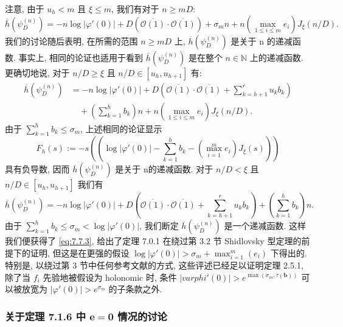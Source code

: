 注意, 由于 \(u_h < m\) 且 \(\xi \le m\), 我们有对于 \(n \ge mD\):
\[ \overline{h}(\psi_D^{(n)}) = -n\log|\varphi'(0)| + D\left(\overline{\mathcal{O}(1)} \cdot \overline{\mathcal{O}(1)}\right) + \sigma_m n + n\left(\max_{1 \le i \le m} e_i\right) J_{\xi}(n/D). \]
我们的讨论随后表明, 在所需的范围 \(n \geq mD\) 上, \(\overline{h}(\psi_D^{(n)})\) 是关于 n 的递减函数. 
事实上, 相同的论证也适用于看到 \(\overline{h}(\psi_D^{(n)})\) 是在整个 \(n \in \mathbb{N}\) 上的递减函数. 
更确切地说, 对于 \(n/D \geq \xi\) 且 \(n/D \in [u_h, u_{h+1}]\) 有:
\begin{equation}\label{eq:7.7.4}
\begin{aligned}
\overline{h}(\psi_D^{(n)}) 
&= -n\log|\varphi'(0)| + D\left(\overline{\mathcal{O}(1)} \cdot \overline{\mathcal{O}(1)} + \sum_{k=h+1}^r u_k b_k\right) \\
&\quad + \left(\sum_{k=1}^h b_k\right) n + n\left(\max_{1 \le i \le m} e_i\right) J_{\xi}(n/D).
\end{aligned}
\end{equation}
由于 \(\sum_{k=1}^{h} b_k \leq \sigma_m\), 上述相同的论证显示
\[ F_h(s) := -s \left( \left( \log |\varphi'(0)| - \sum_{k=1}^h b_k - (\max_{i=1}^m e_i) J_{\xi}(s) \right) \right) \]
具有负导数, 因而 \(\overline{h}(\psi_D^{(n)})\) 是关于 n的递减函数. 
对于 \(n/D < \xi\) 且 \(n/D \in [u_h, u_{h+1}]\) 我们有
\[ \overline{h}(\psi_D^{(n)}) = -n\log|\varphi'(0)| + D\left(\overline{\mathcal{O}(1)} \cdot \overline{\mathcal{O}(1)} + \sum_{k=h+1}^r u_k b_k\right) + \left(\sum_{k=1}^h b_k\right) n. \]
由于 \(\sum_{k=1}^h b_k \leq \sigma_m < \log |\varphi'(0)|\), 
我们断定 \(\overline{h}(\psi_D^{(n)})\) 是一个递减函数. 
这样我们便获得了 \eqref{eq:7.7.3}, 给出了定理 7.0.1 在绕过第 3.2 节 Shidlovsky 型定理的前提下的证明, 
但这是在更强的假设 \(\log |\varphi'(0)| > \sigma_m + \max_{i=1}^m (e_i)\) 下得出的. 
特别是, 以绕过第 3 节中任何参考文献的方式, 
这些评述已经足以证明定理 2.5.1, 
除了当 \(f_i\) 先验地被假设为 holonomic 时, 条件 \(|varphi'(0)| > e^{\max(\sigma_m, \tau(\mathbf{b}))}\) 
可以被放宽为 \(|\varphi'(0)| > e^{\sigma_m}\) 的子条款之外.

\subsubsection{关于定理 7.1.6 中 \(\mathbf{e} = \mathbf{0}\) 情况的讨论}\label{sec:7.7.5}

